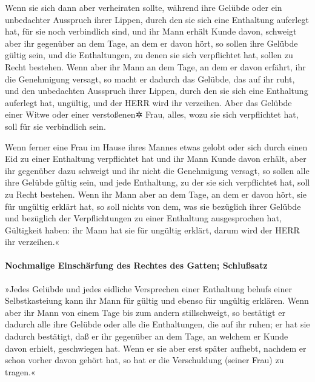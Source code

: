 Wenn sie sich dann aber verheiraten sollte, während ihre
Gelübde oder ein unbedachter Ausspruch ihrer Lippen, durch den sie sich
eine Enthaltung auferlegt hat, für sie noch verbindlich sind,
und ihr Mann erhält Kunde davon, schweigt aber ihr
gegenüber an dem Tage, an dem er davon hört, so sollen ihre Gelübde
gültig sein, und die Enthaltungen, zu denen sie sich verpflichtet hat,
sollen zu Recht bestehen. Wenn aber ihr Mann an dem Tage,
an dem er davon erfährt, ihr die Genehmigung versagt, so macht er
dadurch das Gelübde, das auf ihr ruht, und den unbedachten Ausspruch
ihrer Lippen, durch den sie sich eine Enthaltung auferlegt hat,
ungültig, und der HERR wird ihr verzeihen. Aber das
Gelübde einer Witwe oder einer verstoßenen✲ Frau, alles, wozu sie sich
verpflichtet hat, soll für sie verbindlich sein.

Wenn ferner eine Frau im Hause ihres Mannes etwas gelobt
oder sich durch einen Eid zu einer Enthaltung verpflichtet hat
und ihr Mann Kunde davon erhält, aber ihr gegenüber dazu
schweigt und ihr nicht die Genehmigung versagt, so sollen alle ihre
Gelübde gültig sein, und jede Enthaltung, zu der sie sich verpflichtet
hat, soll zu Recht bestehen. Wenn ihr Mann aber an dem
Tage, an dem er davon hört, sie für ungültig erklärt hat, so soll nichts
von dem, was sie bezüglich ihrer Gelübde und bezüglich der
Verpflichtungen zu einer Enthaltung ausgesprochen hat, Gültigkeit haben:
ihr Mann hat sie für ungültig erklärt, darum wird der HERR ihr
verzeihen.«

\hypertarget{nochmalige-einschuxe4rfung-des-rechtes-des-gatten-schluuxdfsatz}{%
\paragraph{Nochmalige Einschärfung des Rechtes des Gatten;
Schlußsatz}\label{nochmalige-einschuxe4rfung-des-rechtes-des-gatten-schluuxdfsatz}}

»Jedes Gelübde und jedes eidliche Versprechen einer
Enthaltung behufs einer Selbstkasteiung kann ihr Mann für gültig und
ebenso für ungültig erklären. Wenn aber ihr Mann von
einem Tage bis zum andern stillschweigt, so bestätigt er dadurch alle
ihre Gelübde oder alle die Enthaltungen, die auf ihr ruhen; er hat sie
dadurch bestätigt, daß er ihr gegenüber an dem Tage, an welchem er Kunde
davon erhielt, geschwiegen hat. Wenn er sie aber erst
später aufhebt, nachdem er schon vorher davon gehört hat, so hat er die
Verschuldung (seiner Frau) zu tragen.«

